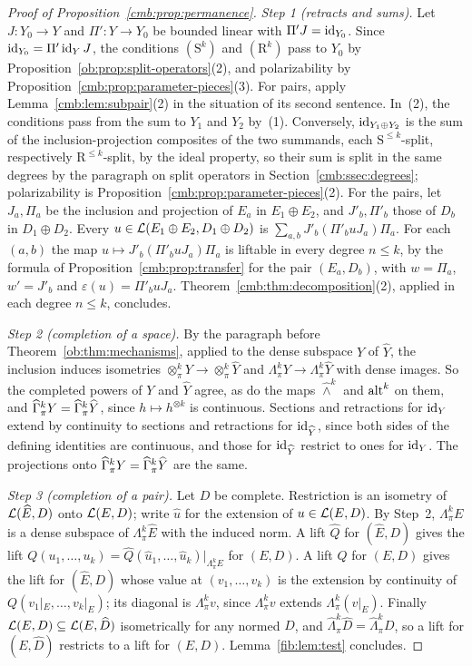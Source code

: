 \begin{proof}[Proof of Proposition~\ref{cmb:prop:permanence}]
\emph{Step 1 (retracts and sums).} Let $J\colon Y_0\to Y$ and $\Pi'\colon Y\to Y_0$ be bounded linear with
$\Pi'J=\mathrm{id}_{Y_0}$. Since $\mathrm{id}_{Y_0}=\Pi'\,\mathrm{id}_Y\,J$, the conditions $(\mathrm S^k)$ and $(\mathrm R^k)$ pass to $Y_0$ by
Proposition~\ref{ob:prop:split-operators}(2), and polarizability by Proposition~\ref{cmb:prop:parameter-pieces}(3). For
pairs, apply Lemma~\ref{cmb:lem:subpair}(2) in the situation of its second sentence. In~(2), the conditions pass from the
sum to $Y_1$ and $Y_2$ by~(1). Conversely, $\mathrm{id}_{Y_1\oplus Y_2}$ is the sum of the inclusion-projection composites of the
two summands, each $\mathrm S^{\le k}$-split, respectively $\mathrm R^{\le k}$-split, by the ideal property, so their sum
is split in the same degrees by the paragraph on split operators in Section~\ref{cmb:ssec:degrees}; polarizability is
Proposition~\ref{cmb:prop:parameter-pieces}(2). For the pairs, let $J_a,\Pi_a$ be the inclusion and projection of $E_a$
in $E_1\oplus E_2$, and $J'_b,\Pi'_b$ those of $D_b$ in $D_1\oplus D_2$. Every $u\in\mathcal L(E_1\oplus E_2,D_1\oplus D_2)$ is
$\sum_{a,b}J'_b(\Pi'_buJ_a)\Pi_a$. For each $(a,b)$ the map $u\mapsto J'_b(\Pi'_buJ_a)\Pi_a$ is liftable in every degree
$n\le k$, by the formula of Proposition~\ref{cmb:prop:transfer} for the pair $(E_a,D_b)$, with $w=\Pi_a$, $w'=J'_b$ and
$\varepsilon(u)=\Pi'_buJ_a$. Theorem~\ref{cmb:thm:decomposition}(2), applied in each degree $n\le k$, concludes.

\emph{Step 2 (completion of a space).} By the paragraph before Theorem~\ref{ob:thm:mechanisms}, applied to the dense
subspace $Y$ of $\widehat Y$, the inclusion induces isometries $\otimes^k_\pi Y\to\otimes^k_\pi\widehat Y$ and
$\Lambda^k_\pi Y\to\Lambda^k_\pi\widehat Y$ with dense images. So the completed powers of $Y$ and $\widehat Y$ agree, as do
the maps $\widehat\wedge^k$ and $\operatorname{alt}^k$ on them, and $\widehat\Gamma^k_\pi Y=\widehat\Gamma^k_\pi\widehat Y$, since
$h\mapsto h^{\otimes k}$ is continuous. Sections and retractions for $\mathrm{id}_Y$ extend by continuity to sections and
retractions for $\mathrm{id}_{\widehat Y}$, since both sides of the defining identities are continuous, and those for
$\mathrm{id}_{\widehat Y}$ restrict to ones for $\mathrm{id}_Y$. The projections onto $\widehat\Gamma^k_\pi Y=\widehat\Gamma^k_\pi\widehat Y$ are the
same.

\emph{Step 3 (completion of a pair).} Let $D$ be complete. Restriction is an isometry of $\mathcal L(\widehat E,D)$ onto
$\mathcal L(E,D)$; write $\widehat u$ for the extension of $u\in\mathcal L(E,D)$. By Step~2, $\Lambda^k_\pi E$ is a dense subspace of
$\Lambda^k_\pi\widehat E$ with the induced norm. A lift $\widehat Q$ for $(\widehat E,D)$ gives the lift
$Q(u_1,\dots,u_k)=\widehat Q(\widehat u_1,\dots,\widehat u_k)|_{\Lambda^k_\pi E}$ for $(E,D)$. A lift $Q$ for $(E,D)$ gives the lift for $(\widehat E,D)$ whose value at $(v_1,\dots,v_k)$ is the extension
by continuity of $Q(v_1|_E,\dots,v_k|_E)$; its diagonal is $\Lambda^k_\pi v$, since $\Lambda^k_\pi v$ extends
$\Lambda^k_\pi(v|_E)$. Finally $\mathcal L(E,D)\subseteq\mathcal L(E,\widehat D)$ isometrically for any normed $D$, and
$\widehat\Lambda^k_\pi\widehat D=\widehat\Lambda^k_\pi D$, so a lift for $(E,\widehat D)$ restricts to a lift for
$(E,D)$. Lemma~\ref{fib:lem:test} concludes.
\end{proof}
